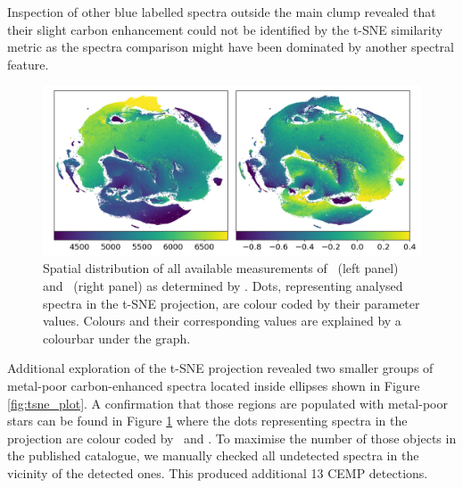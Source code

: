 Inspection of other blue labelled spectra outside the main clump revealed that their slight carbon enhancement could not be identified by the t-SNE similarity metric as the spectra comparison might have been dominated by another spectral feature.

\begin{figure}
	\centering
	\includegraphics[width=\textwidth]{tsne_params_notitle.png}
	\caption{Spatial distribution of all available measurements of \Teff\ (left panel) and \Feh\ (right panel) as determined by \TC. Dots, representing analysed spectra in the t-SNE projection, are colour coded by their parameter values. Colours and their corresponding values are explained by a colourbar under the graph.}
	\label{fig:tsne_teff_feh}
\end{figure}


Additional exploration of the t-SNE projection revealed two smaller groups of metal-poor carbon-enhanced spectra located inside ellipses shown in Figure \ref{fig:tsne_plot}. A confirmation that those regions are populated with metal-poor stars can be found in Figure \ref{fig:tsne_teff_feh} where the dots representing spectra in the projection are colour coded by \Feh\ and \Teff. To maximise the number of those objects in the published catalogue, we manually checked all undetected spectra in the vicinity of the detected ones. This produced additional 13 CEMP detections.

